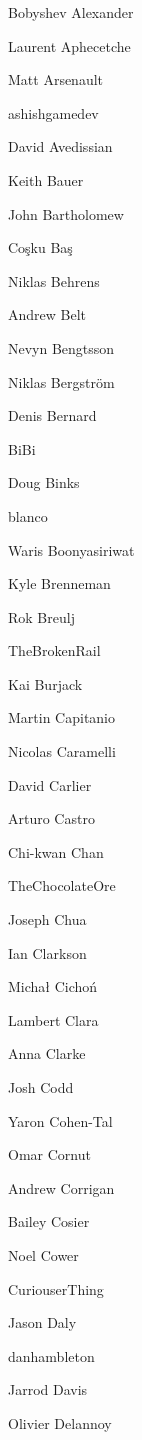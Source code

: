 \begin{DoxyItemize}
\item Bobyshev Alexander
\item Laurent Aphecetche
\item Matt Arsenault
\item ashishgamedev
\item David Avedissian
\item Keith Bauer
\item John Bartholomew
\item Coşku Baş
\item Niklas Behrens
\item Andrew Belt
\item Nevyn Bengtsson
\item Niklas Bergström
\item Denis Bernard
\item Bi\+Bi
\item Doug Binks
\item blanco
\item Waris Boonyasiriwat
\item Kyle Brenneman
\item Rok Breulj
\item The\+Broken\+Rail
\item Kai Burjack
\item Martin Capitanio
\item Nicolas Caramelli
\item David Carlier
\item Arturo Castro
\item Chi-\/kwan Chan
\item The\+Chocolate\+Ore
\item Joseph Chua
\item Ian Clarkson
\item Michał Cichoń
\item Lambert Clara
\item Anna Clarke
\item Josh Codd
\item Yaron Cohen-\/\+Tal
\item Omar Cornut
\item Andrew Corrigan
\item Bailey Cosier
\item Noel Cower
\item Curiouser\+Thing
\item Jason Daly
\item danhambleton
\item Jarrod Davis
\item Olivier Delannoy

\end{DoxyItemize}
